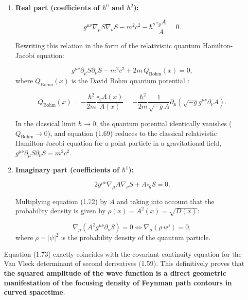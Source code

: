 \begin{enumerate}
\item \textbf{Real part (coefficients of $\hbar^0$ and $\hbar^2$):}

\begin{equation}\label{eq:1.68}\tag{1.68}
g^{\mu\nu}\nabla_\mu S \nabla_\nu S - m^2 c^2 - \hbar^2 \frac{\square_g A}{A} = 0.
\end{equation}

Rewriting this relation in the form of the relativistic quantum Hamilton-Jacobi equation:

\begin{equation}\label{eq:1.69}\tag{1.69}
g^{\mu\nu}\partial_\mu S \partial_\nu S - m^2 c^2 + 2m \, Q_{\text{Bohm}}(x) = 0,
\end{equation}
where $Q_{\text{Bohm}}(x)$ is the David Bohm quantum potential \cite{ref11}:

\begin{equation}\label{eq:1.70}\tag{1.70}
Q_{\text{Bohm}}(x) = -\frac{\hbar^2}{2m} \frac{\square_g A(x)}{A(x)} = -\frac{\hbar^2}{2m} \frac{1}{\sqrt{-g} A} \partial_\mu \left( \sqrt{-g} g^{\mu\nu}\partial_\nu A \right).
\end{equation}

In the classical limit $\hbar \to 0$, the quantum potential identically vanishes ($Q_{\text{Bohm}} \to 0$), and equation (1.69) reduces to the classical relativistic Hamilton-Jacobi equation for a point particle in a gravitational field, $g^{\mu\nu}\partial_\mu S \partial_\nu S = m^2 c^2$.

\item \textbf{Imaginary part (coefficients of $\hbar^1$):}

\begin{equation}\label{eq:1.72}\tag{1.72}
2 g^{\mu\nu}\nabla_\mu A \nabla_\nu S + A \square_g S = 0.
\end{equation}

Multiplying equation (1.72) by $A$ and taking into account that the probability density is given by $\rho(x) = A^2(x) = \sqrt{D(x)}$:

\begin{equation}\label{eq:1.73}\tag{1.73}
\nabla_\mu \left( A^2 g^{\mu\nu}\partial_\nu S \right) = 0 \iff \nabla_\mu \left( \rho \, u^\mu \right) = 0,
\end{equation}
where $\rho = |\psi|^2$ is the probability density of the quantum particle.
\end{enumerate}

Equation (1.73) exactly coincides with the covariant continuity equation for the Van Vleck determinant of second derivatives (1.59). This definitively proves that \textbf{the squared amplitude of the wave function is a direct geometric manifestation of the focusing density of Feynman path contours in curved spacetime}.


